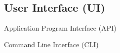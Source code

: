  
    \subsection{User Interface (UI)}    
      \begin{description}
        \item Application Program Interface (API)
        \item Command Line Interface (CLI)
      \end{description}      